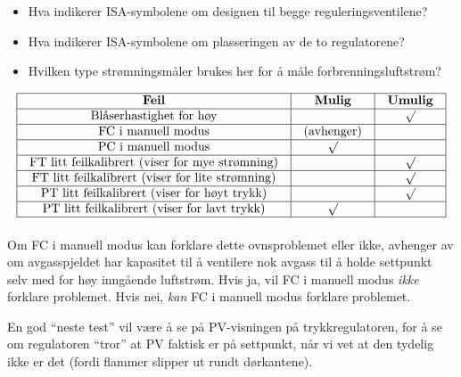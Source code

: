 \begin{itemize}
\item{} Hva indikerer ISA-symbolene om designen til begge reguleringsventilene?
\item{} Hva indikerer ISA-symbolene om plasseringen av de to regulatorene?
\item{} Hvilken type strømningsmåler brukes her for å måle forbrenningsluftstrøm?
\end{itemize}








$$\vbox{\offinterlineskip
\halign{\strut
\vrule \quad\hfil # \ \hfil & 
\vrule \quad\hfil # \ \hfil & 
\vrule \quad\hfil # \ \hfil \vrule \cr
\noalign{\hrule}
%
{\bf Feil} & {\bf Mulig} & {\bf Umulig} \cr
%
\noalign{\hrule}
%
Blåserhastighet for høy &  & $\surd$ \cr
%
\noalign{\hrule}
%
FC i manuell modus & (avhenger) &  \cr
%
\noalign{\hrule}
%
PC i manuell modus & $\surd$ &  \cr
%
\noalign{\hrule}
%
FT litt feilkalibrert (viser for mye strømning) &  & $\surd$ \cr
%
\noalign{\hrule}
%
FT litt feilkalibrert (viser for lite strømning) &  & $\surd$ \cr
%
\noalign{\hrule}
%
PT litt feilkalibrert (viser for høyt trykk) &  & $\surd$ \cr
%
\noalign{\hrule}
%
PT litt feilkalibrert (viser for lavt trykk) & $\surd$ &  \cr
%
\noalign{\hrule}
} %
}$$ %

Om FC i manuell modus kan forklare dette ovnsproblemet eller ikke, avhenger av om avgasspjeldet har kapasitet til å ventilere nok avgass til å holde settpunkt selv med for høy inngående luftstrøm. Hvis ja, vil FC i manuell modus {\it ikke} forklare problemet. Hvis nei, {\it kan} FC i manuell modus forklare problemet.







En god ``neste test'' vil være å se på PV-visningen på trykkregulatoren, for å se om regulatoren ``tror'' at PV faktisk er på settpunkt, når vi vet at den tydelig ikke er det (fordi flammer slipper ut rundt dørkantene).




